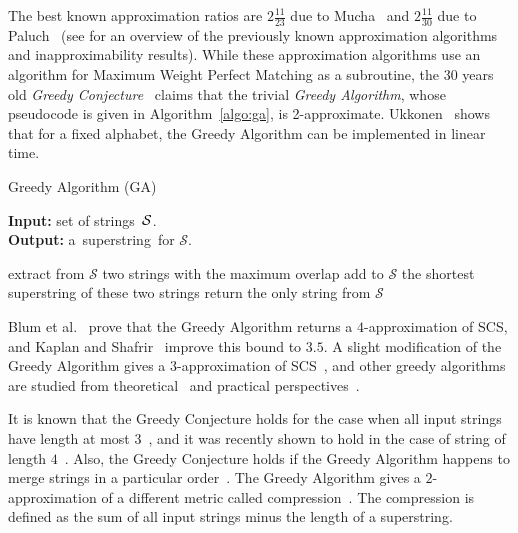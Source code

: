 \documentclass[11pt]{article}
\begin{document}
The best known approximation ratios are $2\frac{11}{23}$ due to Mucha~\cite{M2013} and $2\frac{11}{30}$ due to Paluch~\cite{P14} (see \cite[Section~2.1]{GKM13} for an overview of the 
previously known approximation algorithms
and inapproximability results). While these approximation algorithms use an algorithm for Maximum Weight Perfect Matching as a subroutine, the $30$ years old \emph{Greedy Conjecture}~\cite{storer1987data, TU1988, T1989, BJLTY1991} claims that the trivial \emph{Greedy Algorithm}, whose pseudocode is given in Algorithm~\ref{algo:ga}, is 2-approximate. Ukkonen~\cite{ukkonen1990linear} shows that for a fixed alphabet, the Greedy Algorithm can be implemented in linear time.

\begin{algorithm}[ht]
\label{algo:ga}
\caption{Greedy Algorithm (GA)}
\hspace*{\algorithmicindent} \textbf{Input:} set of strings~${\cal S}$.\\
\hspace*{\algorithmicindent} \textbf{Output:} a~superstring~for $\mathcal{S}$.
\begin{algorithmic}[1]
\State extract from $\mathcal{S}$ two strings with the maximum overlap
\State add to $\mathcal{S}$ the shortest superstring of these two strings
\EndWhile
\State return the only string from $\mathcal{S}$
\end{algorithmic}
\end{algorithm}


Blum et al.~\cite{BJLTY1991} prove that the Greedy Algorithm returns a $4$-approximation of SCS, and Kaplan and Shafrir~\cite{KS2005} improve this bound to $3.5$. A slight modification of the Greedy Algorithm gives a $3$-approximation of SCS~\cite{BJLTY1991}, and other greedy algorithms are studied from theoretical~\cite{BJLTY1991,rivals2018superstrings} and practical perspectives~\cite{romero2004experimental, cazaux2018practical}.

It is known that the Greedy Conjecture holds for the case when all input strings have length at most $3$~\cite{TU1988, cazaux20143}, and it was recently shown to hold in the case of string of length $4$~\cite{kulikov2015greedy}. Also, the Greedy Conjecture holds if the Greedy Algorithm happens to merge strings in a particular order~\cite{weinard2006greedy, laube2005conditional}. The Greedy Algorithm gives a $2$-approximation of a different metric called compression~\cite{TU1988}. The compression is defined as the sum of all input strings minus the length of a superstring.
\end{document}
